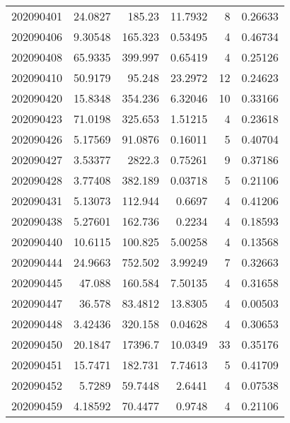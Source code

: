 \begin{tabular}{rrrrrr}
 202090401 &         24.0827  &      185.23   &           11.7932  &           8 & 0.26633 \\
 202090406 &          9.30548 &      165.323  &            0.53495 &           4 & 0.46734 \\
 202090408 &         65.9335  &      399.997  &            0.65419 &           4 & 0.25126 \\
 202090410 &         50.9179  &       95.248  &           23.2972  &          12 & 0.24623 \\
 202090420 &         15.8348  &      354.236  &            6.32046 &          10 & 0.33166 \\
 202090423 &         71.0198  &      325.653  &            1.51215 &           4 & 0.23618 \\
 202090426 &          5.17569 &       91.0876 &            0.16011 &           5 & 0.40704 \\
 202090427 &          3.53377 &     2822.3    &            0.75261 &           9 & 0.37186 \\
 202090428 &          3.77408 &      382.189  &            0.03718 &           5 & 0.21106 \\
 202090431 &          5.13073 &      112.944  &            0.6697  &           4 & 0.41206 \\
 202090438 &          5.27601 &      162.736  &            0.2234  &           4 & 0.18593 \\
 202090440 &         10.6115  &      100.825  &            5.00258 &           4 & 0.13568 \\
 202090444 &         24.9663  &      752.502  &            3.99249 &           7 & 0.32663 \\
 202090445 &         47.088   &      160.584  &            7.50135 &           4 & 0.31658 \\
 202090447 &         36.578   &       83.4812 &           13.8305  &           4 & 0.00503 \\
 202090448 &          3.42436 &      320.158  &            0.04628 &           4 & 0.30653 \\
 202090450 &         20.1847  &    17396.7    &           10.0349  &          33 & 0.35176 \\
 202090451 &         15.7471  &      182.731  &            7.74613 &           5 & 0.41709 \\
 202090452 &          5.7289  &       59.7448 &            2.6441  &           4 & 0.07538 \\
 202090459 &          4.18592 &       70.4477 &            0.9748  &           4 & 0.21106 \\

\end{tabular}
